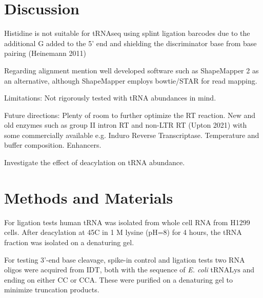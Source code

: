 \documentclass[9pt,lineno]{elife}
\begin{document}
\section{Discussion}


Histidine is not suitable for tRNAseq using splint ligation barcodes due to the additional G added to the 5' end and shielding the discriminator base from base pairing (Heinemann 2011)


Regarding alignment mention well developed software such as ShapeMapper 2 as an alternative, although ShapeMapper employs bowtie/STAR for read mapping.



Limitations:
Not rigorously tested with tRNA abundances in mind.



Future directions:
Plenty of room to further optimize the RT reaction.
New and old enzymes such as group II intron RT and non-LTR RT (Upton 2021) with some commercially available e.g. Induro Reverse Transcriptase.
Temperature and buffer composition.
Enhancers.


Investigate the effect of deacylation on tRNA abundance.











\section{Methods and Materials}


For ligation tests human tRNA was isolated from whole cell RNA from H1299 cells.
After deacylation at 45C in 1 M lysine (pH=8) for 4 hours, the tRNA fraction was isolated on a denaturing gel.

For testing 3'-end base cleavage, spike-in control and ligation tests two RNA oligos were acquired from IDT, both with the sequence of \textit{E. coli} tRNA$\text{Lys}$ and ending on either CC or CCA.
These were purified on a denaturing gel to minimize truncation products.
\end{document}

